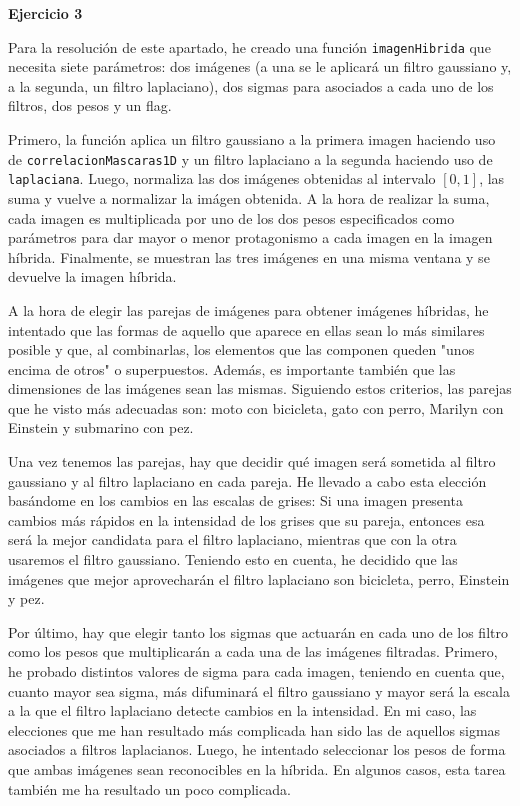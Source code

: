 \documentclass[10pt,a4paper]{article}
\begin{document}
\hfill \break
\hfill \break
\hfill \break
\hfill \break
\hfill \break
\hfill \break
\textbf{\huge Ejercicio 3}
\hfill \break

Para la resolución de este apartado, he creado una función \texttt{imagenHibrida} que necesita siete parámetros: dos imágenes (a una se le aplicará un filtro gaussiano y, a la segunda, un filtro laplaciano), dos sigmas para asociados a cada uno de los filtros, dos pesos y un flag.

Primero, la función aplica un filtro gaussiano a la primera imagen haciendo uso de \texttt{correlacionMascaras1D} y un filtro laplaciano a la segunda haciendo uso de \texttt{laplaciana}. Luego, normaliza las dos imágenes obtenidas al intervalo $[0,1]$, las suma y vuelve a normalizar la imágen obtenida. A la hora de realizar la suma, cada imagen es multiplicada por uno de los dos pesos especificados como parámetros para dar mayor o menor protagonismo a cada imagen en la imagen híbrida. Finalmente, se muestran las tres imágenes en una misma ventana y se devuelve la imagen híbrida.

A la hora de elegir las parejas de imágenes para obtener imágenes híbridas, he intentado que las formas de aquello que aparece en ellas sean lo más similares posible y que, al combinarlas, los elementos que las componen queden "unos encima de otros" o superpuestos. Además, es importante también que las dimensiones de las imágenes sean las mismas. Siguiendo estos criterios, las parejas que he visto más adecuadas son: moto con bicicleta, gato con perro, Marilyn con Einstein y submarino con pez.

Una vez tenemos las parejas, hay que decidir qué imagen será sometida al filtro gaussiano y al filtro laplaciano en cada pareja. He llevado a cabo esta elección basándome en los cambios en las escalas de grises: Si una imagen presenta cambios más rápidos en la intensidad de los grises que su pareja, entonces esa será la mejor candidata para el filtro laplaciano, mientras que con la otra usaremos el filtro gaussiano. Teniendo esto en cuenta, he decidido que las imágenes que mejor aprovecharán el filtro laplaciano son bicicleta, perro, Einstein y pez. 

Por último, hay que elegir tanto los sigmas que actuarán en cada uno de los filtro como los pesos que multiplicarán a cada una de las imágenes filtradas. Primero, he probado distintos valores de sigma para cada imagen, teniendo en cuenta que, cuanto mayor sea sigma, más difuminará el filtro gaussiano y mayor será la escala a la que el filtro laplaciano detecte cambios en la intensidad. En mi caso, las elecciones que me han resultado más complicada han sido las de aquellos sigmas asociados a filtros laplacianos. Luego, he intentado seleccionar los pesos de forma que ambas imágenes sean reconocibles en la híbrida. En algunos casos, esta tarea también me ha resultado un poco complicada.
\end{document}
